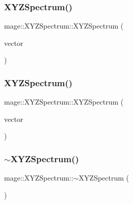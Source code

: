\hypertarget{structmage_1_1_x_y_z_spectrum_a4775c0f3d8bff524281c186ee5e91e60}{}\label{structmage_1_1_x_y_z_spectrum_a4775c0f3d8bff524281c186ee5e91e60} 
\subsubsection{\texorpdfstring{X\+Y\+Z\+Spectrum()}{XYZSpectrum()}\hspace{0.1cm}{\footnotesize\ttfamily [7/8]}}
{\footnotesize\ttfamily mage\+::\+X\+Y\+Z\+Spectrum\+::\+X\+Y\+Z\+Spectrum (\begin{DoxyParamCaption}\item[{const X\+M\+F\+L\+O\+A\+T3 \&}]{vector }\end{DoxyParamCaption})\hspace{0.3cm}{\ttfamily [explicit]}}

\hypertarget{structmage_1_1_x_y_z_spectrum_a729b4911b8328806d411e60e1bd2fa6b}{}\label{structmage_1_1_x_y_z_spectrum_a729b4911b8328806d411e60e1bd2fa6b} 
\subsubsection{\texorpdfstring{X\+Y\+Z\+Spectrum()}{XYZSpectrum()}\hspace{0.1cm}{\footnotesize\ttfamily [8/8]}}
{\footnotesize\ttfamily mage\+::\+X\+Y\+Z\+Spectrum\+::\+X\+Y\+Z\+Spectrum (\begin{DoxyParamCaption}\item[{X\+M\+F\+L\+O\+A\+T3 \&\&}]{vector }\end{DoxyParamCaption})\hspace{0.3cm}{\ttfamily [explicit]}}

\hypertarget{structmage_1_1_x_y_z_spectrum_af3a318ebdb1eb1e47cd81707850049a7}{}\label{structmage_1_1_x_y_z_spectrum_af3a318ebdb1eb1e47cd81707850049a7} 
\subsubsection{\texorpdfstring{$\sim$\+X\+Y\+Z\+Spectrum()}{~XYZSpectrum()}}
{\footnotesize\ttfamily mage\+::\+X\+Y\+Z\+Spectrum\+::$\sim$\+X\+Y\+Z\+Spectrum (\begin{DoxyParamCaption}{ }\end{DoxyParamCaption})\hspace{0.3cm}{\ttfamily [default]}}



